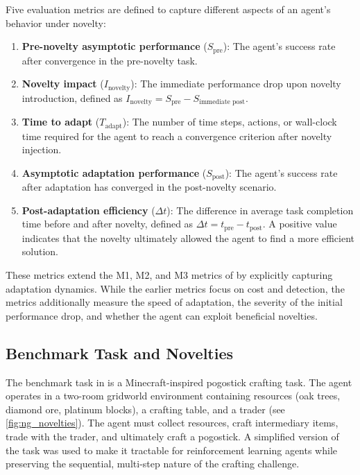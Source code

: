 Five evaluation metrics are defined to capture different aspects of an agent's behavior under novelty:
\begin{enumerate}[leftmargin=*]
    \item \textbf{Pre-novelty asymptotic performance} ($S_\text{pre}$): The agent's success rate after convergence in the pre-novelty task.
    \item \textbf{Novelty impact} ($I_\text{novelty}$): The immediate performance drop upon novelty introduction, defined as $I_\text{novelty} = S_\text{pre} - S_\text{immediate post}$.
    \item \textbf{Time to adapt} ($T_\text{adapt}$): The number of time steps, actions, or wall-clock time required for the agent to reach a convergence criterion after novelty injection.
    \item \textbf{Asymptotic adaptation performance} ($S_\text{post}$): The agent's success rate after adaptation has converged in the post-novelty scenario.
    \item \textbf{Post-adaptation efficiency} ($\Delta t$): The difference in average task completion time before and after novelty, defined as $\Delta t = t_\text{pre} - t_\text{post}$. A positive value indicates that the novelty ultimately allowed the agent to find a more efficient solution.
\end{enumerate}

These metrics extend the M1, M2, and M3 metrics of \NovelGridworlds{} by explicitly capturing adaptation dynamics. While the earlier metrics focus on cost and detection, the \NovelGym{} metrics additionally measure the speed of adaptation, the severity of the initial performance drop, and whether the agent can exploit beneficial novelties.


\subsection{Benchmark Task and Novelties}
\label{sec:ng_task}

The benchmark task in \NovelGym{} is a Minecraft-inspired pogostick crafting task. The agent operates in a two-room gridworld environment containing resources (oak trees, diamond ore, platinum blocks), a crafting table, and a trader (see \cref{fig:ng_novelties}). The agent must collect resources, craft intermediary items, trade with the trader, and ultimately craft a pogostick. A simplified version of the task was used to make it tractable for reinforcement learning agents while preserving the sequential, multi-step nature of the crafting challenge.

